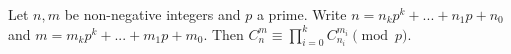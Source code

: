 Let $n,m$ be non-negative integers and $p$ a prime. 
Write $n=n_kp^k+...+n_1p+n_0$ and $m=m_kp^k+...+m_1p+m_0$. 
Then $C^m_n \equiv \prod_{i=0}^k C^{m_i}_{n_i} \pmod{p}$.